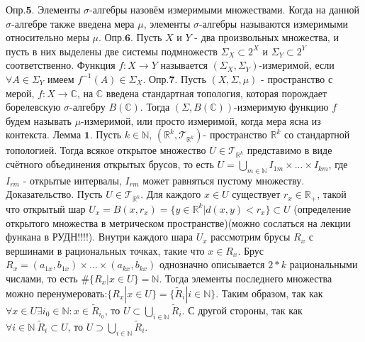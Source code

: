 \documentclass[a4paper,14pt]{article}
\begin{document}
$\textbf{Опр.5.}$ Элементы $\sigma$-алгебры назовём измеримыми множествами. Когда на данной $\sigma$-алгебре также введена мера $\mu$, элементы $\sigma$-алгебры называются измеримыми относительно меры $\mu$.\newline
$\textbf{Опр.6.}$ Пусть $X$ и $Y$ - два произвольных множества, и пусть в них выделены две системы подмножеств $\Sigma_X\subset 2^X$ и $\Sigma_Y\subset 2^Y$ соответственно. Функция $f:X\rightarrow Y$ называется $(\Sigma_X,\Sigma_Y)$-измеримой, если $\forall A\in \Sigma_Y$ имеем $f^{-1}(A)\in \Sigma_X$.\newline
$\textbf{Опр.7.}$ Пусть $(X,\Sigma,\mu)$ - пространство с мерой, $f:X\rightarrow\mathbb{C}$, на $\mathbb{C}$ введена стандартная топология, которая порождает борелевскую $\sigma$-алгебру $B(\mathbb{C})$. Тогда $(\Sigma,B(\mathbb{C}))$-измеримую функцию $f$ будем называть $\mu$-измеримой, или просто измеримой, когда мера ясна из контекста.\newline
$\textbf{Лемма 1.}$ Пусть $k\in\mathbb{N}$, $(\mathbb{R}^k,\mathcal{T}_{\mathbb{R}^k})$- пространство $\mathbb{R}^k$ со стандартной топологией. Тогда всякое открытое множество $U\in\mathcal{T}_{\mathbb{R}^k}$ представимо в виде счётного объединения открытых брусов, то есть $U=\bigcup\limits_{m\in\mathbb{N}} I_{1m}\times ...\times I_{km}$, где $I_{rm}$ - открытые интервалы, $I_{rm}$ может равняться пустому множеству.\newline
$\textbf{Доказательство.}$ Пусть $U\in\mathcal{T}_{\mathbb{R}^k}$. Для каждого $x\in U$ существует $r_x\in\mathbb{R_{+}}$, такой что открытый шар $U_x=B(x,r_x)=\{y\in\mathbb{R}^k|d(x,y)<r_x\}\subset U$ (определение открытого множества в метрическом пространстве)(можно сослаться на лекции функана в РУДН!!!!). Внутри каждого шара $U_x$ рассмотрим брусы $R_x$ с вершинами в рациональных точках, такие что $x\in R_x$. Брус $R_x=(a_{1x},b_{1x})\times ... \times (a_{kx},b_{kx})$ однозначно описывается $2*k$ рациональными числами, то есть $\#\{R_x|x\in U\}=\mathbb{N}$. Тогда элементы последнего множества можно перенумеровать:$\{R_x|x\in U\}=\{\widetilde{R}_i|i\in\mathbb{N}\}$.\newline
Таким образом, так как $\forall x\in U \exists i_0\in\mathbb{N}: x\in\widetilde{R}_{i_0}$, то $U\subset\bigcup\limits_{i\in\mathbb{N}} \widetilde{R}_i$. С другой стороны, так как $\forall i\in\mathbb{N}\ \widetilde{R}_i\subset U$, то $U\supset\bigcup\limits_{i\in\mathbb{N}} \widetilde{R}_i$.\newline
\end{document}

